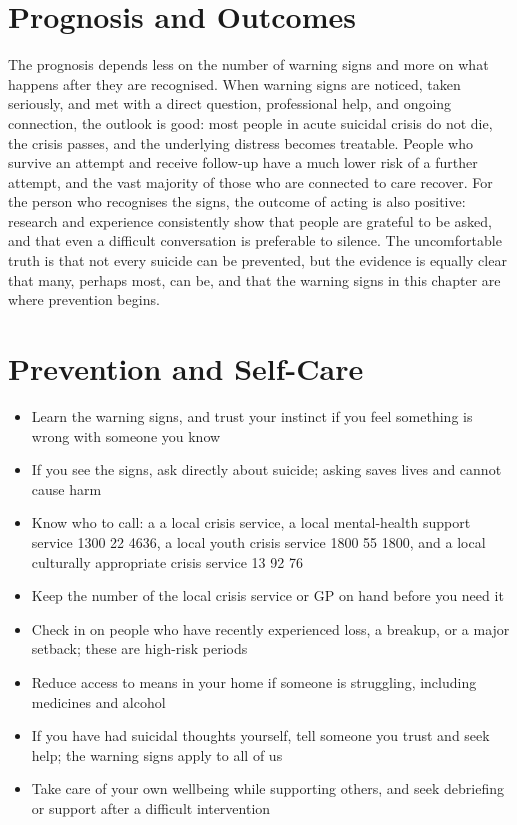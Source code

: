 \section*{Prognosis and Outcomes}
The prognosis depends less on the number of warning signs and more on what happens after they are recognised. When warning signs are noticed, taken seriously, and met with a direct question, professional help, and ongoing connection, the outlook is good: most people in acute suicidal crisis do not die, the crisis passes, and the underlying distress becomes treatable. People who survive an attempt and receive follow-up have a much lower risk of a further attempt, and the vast majority of those who are connected to care recover. For the person who recognises the signs, the outcome of acting is also positive: research and experience consistently show that people are grateful to be asked, and that even a difficult conversation is preferable to silence. The uncomfortable truth is that not every suicide can be prevented, but the evidence is equally clear that many, perhaps most, can be, and that the warning signs in this chapter are where prevention begins.

\section*{Prevention and Self-Care}
\begin{itemize}
    \item Learn the warning signs, and trust your instinct if you feel something is wrong with someone you know
    \item If you see the signs, ask directly about suicide; asking saves lives and cannot cause harm
    \item Know who to call: a a local crisis service, a local mental-health support service 1300 22 4636, a local youth crisis service 1800 55 1800, and a local culturally appropriate crisis service 13 92 76
    \item Keep the number of the local crisis service or GP on hand before you need it
    \item Check in on people who have recently experienced loss, a breakup, or a major setback; these are high-risk periods
    \item Reduce access to means in your home if someone is struggling, including medicines and alcohol
    \item If you have had suicidal thoughts yourself, tell someone you trust and seek help; the warning signs apply to all of us
    \item Take care of your own wellbeing while supporting others, and seek debriefing or support after a difficult intervention
\end{itemize}

